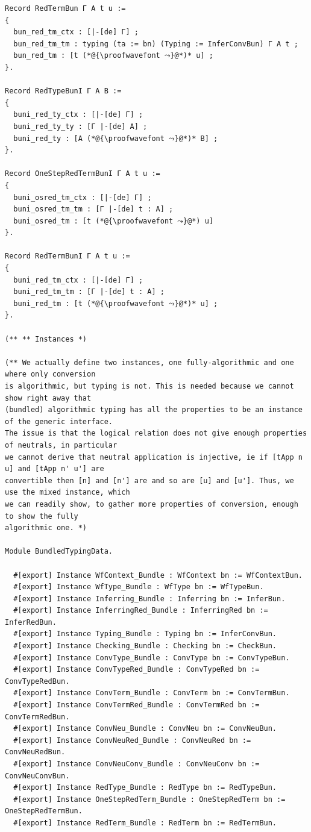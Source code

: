 \begin{lstlisting}
Record RedTermBun Γ A t u :=
{
  bun_red_tm_ctx : [|-[de] Γ] ;
  bun_red_tm_tm : typing (ta := bn) (Typing := InferConvBun) Γ A t ;
  bun_red_tm : [t (*@{\proofwavefont ⤳}@*)* u] ;
}.

Record RedTypeBunI Γ A B :=
{
  buni_red_ty_ctx : [|-[de] Γ] ;
  buni_red_ty_ty : [Γ |-[de] A] ;
  buni_red_ty : [A (*@{\proofwavefont ⤳}@*)* B] ;
}.

Record OneStepRedTermBunI Γ A t u :=
{
  buni_osred_tm_ctx : [|-[de] Γ] ;
  buni_osred_tm_tm : [Γ |-[de] t : A] ;
  buni_osred_tm : [t (*@{\proofwavefont ⤳}@*) u]
}.

Record RedTermBunI Γ A t u :=
{
  buni_red_tm_ctx : [|-[de] Γ] ;
  buni_red_tm_tm : [Γ |-[de] t : A] ;
  buni_red_tm : [t (*@{\proofwavefont ⤳}@*)* u] ;
}.

(** ** Instances *)

(** We actually define two instances, one fully-algorithmic and one where only conversion
is algorithmic, but typing is not. This is needed because we cannot show right away that
(bundled) algorithmic typing has all the properties to be an instance of the generic interface.
The issue is that the logical relation does not give enough properties of neutrals, in particular
we cannot derive that neutral application is injective, ie if [tApp n u] and [tApp n' u'] are
convertible then [n] and [n'] are and so are [u] and [u']. Thus, we use the mixed instance, which
we can readily show, to gather more properties of conversion, enough to show the fully 
algorithmic one. *)

Module BundledTypingData.

  #[export] Instance WfContext_Bundle : WfContext bn := WfContextBun.
  #[export] Instance WfType_Bundle : WfType bn := WfTypeBun.
  #[export] Instance Inferring_Bundle : Inferring bn := InferBun. 
  #[export] Instance InferringRed_Bundle : InferringRed bn := InferRedBun.
  #[export] Instance Typing_Bundle : Typing bn := InferConvBun.
  #[export] Instance Checking_Bundle : Checking bn := CheckBun.
  #[export] Instance ConvType_Bundle : ConvType bn := ConvTypeBun.
  #[export] Instance ConvTypeRed_Bundle : ConvTypeRed bn :=  ConvTypeRedBun.
  #[export] Instance ConvTerm_Bundle : ConvTerm bn := ConvTermBun.
  #[export] Instance ConvTermRed_Bundle : ConvTermRed bn := ConvTermRedBun.
  #[export] Instance ConvNeu_Bundle : ConvNeu bn := ConvNeuBun.
  #[export] Instance ConvNeuRed_Bundle : ConvNeuRed bn := ConvNeuRedBun.
  #[export] Instance ConvNeuConv_Bundle : ConvNeuConv bn := ConvNeuConvBun.
  #[export] Instance RedType_Bundle : RedType bn := RedTypeBun.
  #[export] Instance OneStepRedTerm_Bundle : OneStepRedTerm bn := OneStepRedTermBun.
  #[export] Instance RedTerm_Bundle : RedTerm bn := RedTermBun.


\end{lstlisting}
